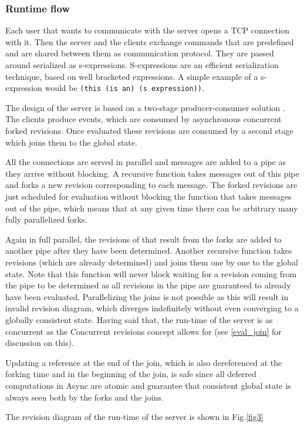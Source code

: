 \documentclass[12pt,twoside,notitlepage]{report}
\begin{document}
{\subsubsection{Runtime flow}
Each user that wants to communicate with the server opens a TCP connection with it. Then the server and the clients exchange commands that are predefined and are shared between them as communication protocol. They are passed around serialized as s-expressions. S-expressions are an efficient serialization technique, based on well bracketed expressions. A simple example of a s-expression would be {\tt (this (is an) (s expression))}. 

The design of the server is based on a two-stage producer-consumer solution \cite{bacon}. The clients produce events, which are consumed by asynchronous concurrent forked revisions. Once evaluated these revisions are consumed by a second stage which joins them to the global state. 

All the connections are served in parallel and messages are added to a pipe as they arrive without blocking. A recursive function takes messages out of this pipe and forks a new revision corresponding to each message. The forked revisions are just scheduled for evaluation without blocking the function that takes messages out of the pipe, which means that at any given time there can be arbitrary many fully parallelized forks. 

Again in full parallel, the revisions of that result from the forks are added to another pipe after they have been determined. Another recursive function takes revisions (which are already determined) and joins them one by one to the global state. Note that this function will never block waiting for a revision coming from the pipe to be determined as all revisions in the pipe are guaranteed to already have been evaluated. Parallelizing the joins is not possible as this will result in invalid revision diagram, which diverges indefinitely without even converging to a globally consistent state. Having said that, the run-time of the server is as concurrent as the Concurrent revisions concept allows for (see \ref{eval_join} for discussion on this).

Updating a reference at the end of the join, which is also dereferenced at the forking time and in the beginning of the join, is safe since all deferred computations in Async are atomic and guarantee that consistent global state is always seen both by the forks and the joins. 

The revision diagram of the run-time of the server is shown in Fig.\ref{fig3}

}
\end{document}
